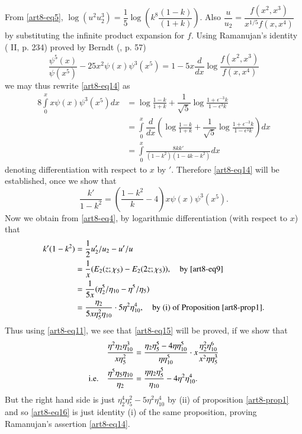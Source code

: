 From \eqref{art8-eq5}, $\log (u^{2}u^{3}_{2})=\dfrac{1}{5}\log\left(k^{8}\dfrac{(1-k)}{(1+k)}\right)$. Also $\dfrac{u}{u_{2}}=\dfrac{f(x^{2},x^{3})}{x^{1/5}f(x,x^{4})}$ by substituting the infinite product expansion for $f$. Using Ramanujan's identity (\cite{art8-key10} II, p. 234) proved by Berndt (\cite{art8-key1}, p. 57)
$$
\frac{\psi^{5}(x)}{\psi(x^{5})}-25x^{2}\psi(x)\psi^{3}(x^{5})=1-5x\dfrac{d}{dx}\log \frac{f(x^{2},x^{3})}{f(x,x^{4})}
$$
we may thus rewrite \eqref{art8-eq14} as
\begin{align*}
8\int\limits^{x}_{0}x\psi(x)\psi^{3}(x^{5})dx &= \log \frac{1-k}{1+k}+\dfrac{1}{\sqrt{5}}\log \frac{1+\epsilon^{-3}k}{1-\epsilon^{3}k}\\
&= \int\limits^{x}_{0}\dfrac{d}{dx}\left(\log \frac{1-k}{1+k}+\dfrac{1}{\sqrt{5}}\log \frac{1+\epsilon^{-3}k}{1-\epsilon^{3}k}\right)dx\\
&= \int\limits^{x}_{0}\frac{8kk'}{(1-k^{2})(1-4k-k^{2})}dx
\end{align*}
denoting differentiation with respect to $x$ by $'$. Therefore \eqref{art8-eq14} will be established, once we show that
\begin{equation}
\frac{k'}{1-k^{2}}=\left(\frac{1-k^{2}}{k}-4\right)x\psi(x)\psi^{3}(x^{5}).\label{art8-eq15}
\end{equation}
Now we obtain from \eqref{art8-eq4}, by logarithmic differentiation (with respect to $x$) that
\begin{align*}
k'(1-k^{2}) &= \frac{1}{2}u'_{2}/u_{2}-u'/u\\
&= \frac{1}{x}(E_{2}(z;\chi_{5})-E_{2}(2z;\chi_{5})),\quad\text{by \eqref{art8-eq9}}\\
&= \frac{1}{5x}(\eta^{5}_{2}/\eta_{10}-\eta^{5}/\eta_{5})\\
&= \frac{\eta_{2}}{5x\eta^{2}_{5}\eta_{10}}\cdot 5\eta^{2}\eta^{4}_{10},\quad \text{by (i) of Proposition \ref{art8-prop1}.}
\end{align*}\pageoriginale 
Thus using \eqref{art8-eq11}, we see that \eqref{art8-eq15} will be proved, if we show that
\begin{align}
& \frac{\eta^{2}\eta_{2}\eta^{3}_{10}}{x\eta^{2}_{5}}=\dfrac{\eta_{2}\eta^{5}_{5}-4\eta\eta^{5}_{10}}{\eta\eta^{5}_{10}}\cdot x\dfrac{\eta^{2}_{2}\eta^{6}_{10}}{x^{2}\eta\eta^{3}_{5}}\notag\\
\text{i.e.}\quad &\frac{\eta^{5}\eta_{5}\eta_{10}}{\eta_{2}}=\frac{\eta\eta_{2}\eta^{5}_{5}}{\eta_{10}}-4\eta^{2}\eta^{4}_{10}.\label{art8-eq16}
\end{align}
But the right hand side is just $\eta^{4}_{2}\eta^{2}_{5}-5\eta^{2}\eta^{4}_{10}$ by (ii) of proposition \ref{art8-prop1} and so \eqref{art8-eq16} is just identity (i) of the same proposition, proving Ramanujan's assertion \eqref{art8-eq14}.

